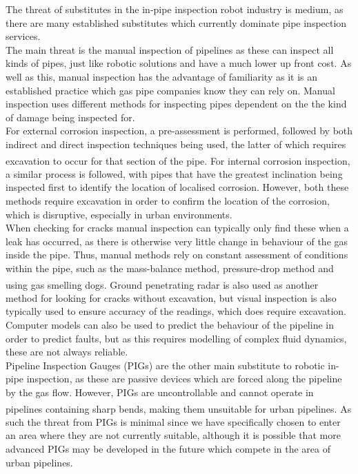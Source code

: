 \documentclass[11pt]{article}		%
\begin{document}
			The threat of substitutes in the in-pipe inspection robot industry is medium, as there are many established substitutes which currently dominate pipe inspection services.
			\\
			The main threat is the manual inspection of pipelines as these can inspect all kinds of pipes, just like robotic solutions and have a much lower up front cost.
			As well as this, manual inspection has the advantage of familiarity as it is an established practice which gas pipe companies know they can rely on.
			Manual inspection uses different methods for inspecting pipes dependent on the the kind of damage being inspected for.
			\\
			For external corrosion inspection, a pre-assessment is performed, followed by both indirect and direct inspection techniques being used, the latter of which requires excavation to occur for that section of the pipe\textsuperscript{\cite{kishawy2010review}}. 
			For internal corrosion inspection, a similar process is followed, with pipes that have the greatest inclination being inspected first to identify the location of localised corrosion. 
			However, both these methods require excavation in order to confirm the location of the corrosion, which is disruptive, especially in urban environments.
			\\
			When checking for cracks manual inspection can typically only find these when a leak has occurred, as there is otherwise very little change in behaviour of the gas inside the pipe.
			Thus, manual methods rely on constant assessment of conditions within the pipe, such as the mass-balance method, pressure-drop method and using gas smelling dogs\textsuperscript{\cite{kishawy2010review}}.
			Ground penetrating radar is also used as another method for looking for cracks without excavation, but visual inspection is also typically used to ensure accuracy of the readings, which does require excavation.
			Computer models can also be used to predict the behaviour of the pipeline in order to predict faults, but as this requires modelling of complex fluid dynamics, these are not always reliable.
			\\
			Pipeline Inspection Gauges (PIGs) are the other main substitute to robotic in-pipe inspection, as these are passive devices which are forced along the pipeline by the gas flow.
			However, PIGs are uncontrollable and cannot operate in pipelines containing sharp bends\textsuperscript{\cite{mills2017advances}}, making them unsuitable for urban pipelines.
			As such the threat from PIGs is minimal since we have specifically chosen to enter an area where they are not currently suitable, although it is possible that more advanced PIGs may be developed in the future which compete in the area of urban pipelines.
		
\end{document}
